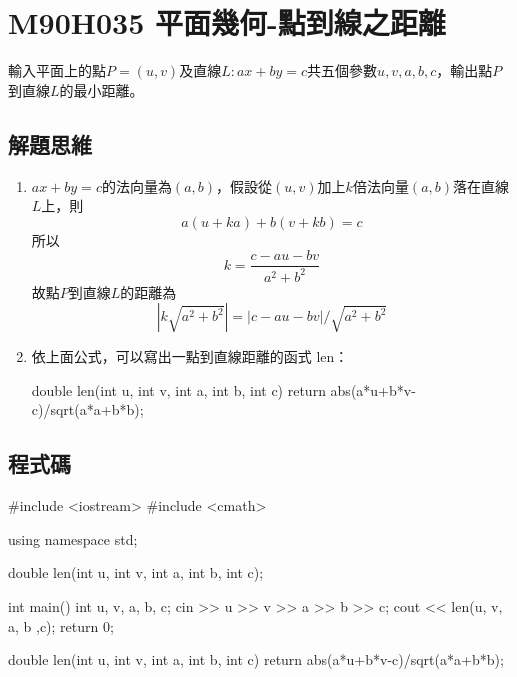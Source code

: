 \section{M90H035 平面幾何-點到線之距離}
輸入平面上的點$P=(u, v)$及直線$L: ax+by=c$共五個參數$u, v, a, b, c$，輸出點$P$到直線$L$的最小距離。
\subsection{解題思維}
\begin{enumerate}
	\item 
$ax+by=c$的法向量為$(a,b)$，假設從$(u,v)$加上$k$倍法向量$(a,b)$落在直線$L$上，則
$$ a(u+ka) + b(v+kb) = c $$
所以
$$ k = \frac{c-au-bv}{a^2+b^2} $$
故點$P$到直線$L$的距離為
$$ |k\sqrt{a^2+b^2}| = |c-au-bv| / \sqrt{a^2+b^2}$$
	\item
	依上面公式，可以寫出一點到直線距離的函式 len：
	\begin{inside}
	double len(int u, int v, int a, int b, int c) {
		return abs(a*u+b*v-c)/sqrt(a*a+b*b);
	}
	\end{inside}
\end{enumerate} 

\subsection{程式碼}
\begin{cppcode}
	#include <iostream>
	#include <cmath>

	using namespace std;
	
	double len(int u, int v, int a, int b, int c);
	
	int main()
	{
		int u, v, a, b, c;
		cin >> u >> v >> a >> b >> c;
		cout << len(u, v, a, b ,c);
		return 0;
	}
	
	double len(int u, int v, int a, int b, int c) {
		return abs(a*u+b*v-c)/sqrt(a*a+b*b);
	}
\end{cppcode}
